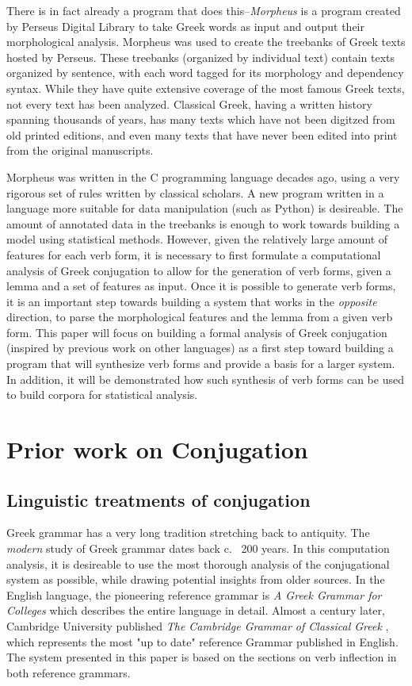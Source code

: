 \documentclass[12pt]{article}
\begin{document}
There is in fact already a program that does this--\textit{Morpheus} is a
program created by Perseus Digital Library to take Greek words as input and
output their morphological analysis. Morpheus was used to create the treebanks
of Greek texts hosted by Perseus. These treebanks (organized by individual
text) contain texts organized by sentence, with each word tagged for its
morphology and dependency syntax. While they have quite extensive coverage of
the most famous Greek texts, not every text has been analyzed. Classical Greek,
having a written history spanning thousands of years, has many texts which have
not been digitzed from old printed editions, and even many texts that have
never been edited into print from the original manuscripts. 

Morpheus was written in the C programming language decades ago, using a very
rigorous set of rules written by classical scholars. A new program written in a
language more suitable for data manipulation (such as Python) is desireable.
The amount of annotated data in the treebanks is enough to work towards
building a model using statistical methods.  However, given the relatively
large amount of features for each verb form, it is necessary to first formulate
a computational analysis of Greek conjugation to allow for the generation of
verb forms, given a lemma and a set of features as input. Once it is possible
to generate verb forms, it is an important step towards building a system that
works in the \textit{opposite} direction, to parse the morphological features
and the lemma from a given verb form. This paper will focus on building a
formal analysis of Greek conjugation (inspired by previous work on other
languages) as a first step toward building a program that will synthesize
verb forms and provide a basis for a larger system. In addition, it will be
demonstrated how such synthesis of verb forms can be used to build corpora 
for statistical analysis.

\section{Prior work on Conjugation}

\subsection{Linguistic treatments of conjugation}

Greek grammar has a very long tradition stretching back to antiquity. The
\textit{modern} study of Greek grammar dates back c. ~200 years. In this
computation analysis, it is desireable to use the most thorough analysis of the
conjugational system as possible, while drawing potential insights from older
sources. In the English language, the pioneering reference grammar is \textit{A
Greek Grammar for Colleges} \citep{smyth1920} which describes the entire
language in detail.  Almost a century later, Cambridge University published
\textit{The Cambridge Grammar of Classical Greek} \citep{boas2019}, which
represents the most "up to date" reference Grammar published in English.  The
system presented in this paper is based on the sections on verb inflection in
both reference grammars. 
\end{document}
